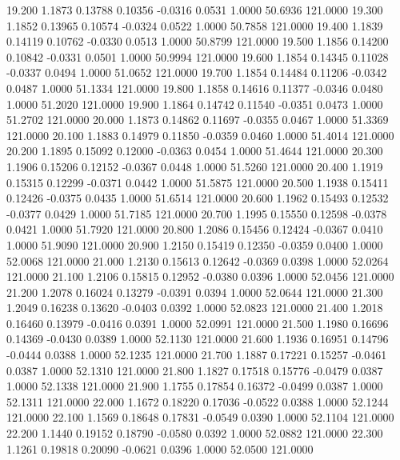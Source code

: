   19.200   1.1873   0.13788   0.10356  -0.0316   0.0531   1.0000  50.6936 121.0000
  19.300   1.1852   0.13965   0.10574  -0.0324   0.0522   1.0000  50.7858 121.0000
  19.400   1.1839   0.14119   0.10762  -0.0330   0.0513   1.0000  50.8799 121.0000
  19.500   1.1856   0.14200   0.10842  -0.0331   0.0501   1.0000  50.9994 121.0000
  19.600   1.1854   0.14345   0.11028  -0.0337   0.0494   1.0000  51.0652 121.0000
  19.700   1.1854   0.14484   0.11206  -0.0342   0.0487   1.0000  51.1334 121.0000
  19.800   1.1858   0.14616   0.11377  -0.0346   0.0480   1.0000  51.2020 121.0000
  19.900   1.1864   0.14742   0.11540  -0.0351   0.0473   1.0000  51.2702 121.0000
  20.000   1.1873   0.14862   0.11697  -0.0355   0.0467   1.0000  51.3369 121.0000
  20.100   1.1883   0.14979   0.11850  -0.0359   0.0460   1.0000  51.4014 121.0000
  20.200   1.1895   0.15092   0.12000  -0.0363   0.0454   1.0000  51.4644 121.0000
  20.300   1.1906   0.15206   0.12152  -0.0367   0.0448   1.0000  51.5260 121.0000
  20.400   1.1919   0.15315   0.12299  -0.0371   0.0442   1.0000  51.5875 121.0000
  20.500   1.1938   0.15411   0.12426  -0.0375   0.0435   1.0000  51.6514 121.0000
  20.600   1.1962   0.15493   0.12532  -0.0377   0.0429   1.0000  51.7185 121.0000
  20.700   1.1995   0.15550   0.12598  -0.0378   0.0421   1.0000  51.7920 121.0000
  20.800   1.2086   0.15456   0.12424  -0.0367   0.0410   1.0000  51.9090 121.0000
  20.900   1.2150   0.15419   0.12350  -0.0359   0.0400   1.0000  52.0068 121.0000
  21.000   1.2130   0.15613   0.12642  -0.0369   0.0398   1.0000  52.0264 121.0000
  21.100   1.2106   0.15815   0.12952  -0.0380   0.0396   1.0000  52.0456 121.0000
  21.200   1.2078   0.16024   0.13279  -0.0391   0.0394   1.0000  52.0644 121.0000
  21.300   1.2049   0.16238   0.13620  -0.0403   0.0392   1.0000  52.0823 121.0000
  21.400   1.2018   0.16460   0.13979  -0.0416   0.0391   1.0000  52.0991 121.0000
  21.500   1.1980   0.16696   0.14369  -0.0430   0.0389   1.0000  52.1130 121.0000
  21.600   1.1936   0.16951   0.14796  -0.0444   0.0388   1.0000  52.1235 121.0000
  21.700   1.1887   0.17221   0.15257  -0.0461   0.0387   1.0000  52.1310 121.0000
  21.800   1.1827   0.17518   0.15776  -0.0479   0.0387   1.0000  52.1338 121.0000
  21.900   1.1755   0.17854   0.16372  -0.0499   0.0387   1.0000  52.1311 121.0000
  22.000   1.1672   0.18220   0.17036  -0.0522   0.0388   1.0000  52.1244 121.0000
  22.100   1.1569   0.18648   0.17831  -0.0549   0.0390   1.0000  52.1104 121.0000
  22.200   1.1440   0.19152   0.18790  -0.0580   0.0392   1.0000  52.0882 121.0000
  22.300   1.1261   0.19818   0.20090  -0.0621   0.0396   1.0000  52.0500 121.0000
